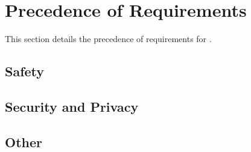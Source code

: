 \KNEADSECTIONNEWPAGE
\section{Precedence of Requirements}
\label{lab:sec_Precedence}
% 
This section details the precedence of requirements for \ThisSys.

\KNEADSUBSECTIONNEWPAGE
\subsection{Safety}
\label{lab:ssec_Precedence_Safety}




\KNEADSUBSECTIONNEWPAGE
\subsection{Security and Privacy}
\label{lab:ssec_Precedence_SecurityAndPrivacy}



\KNEADSUBSECTIONNEWPAGE
\subsection{Other}
\label{lab:ssec_Precedence_Other}



